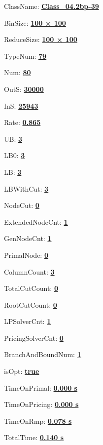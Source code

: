 \documentclass[11pt]{article}
\begin{document}
\pagestyle{empty}


ClassName: \underline{\textbf{Class_04.2bp-39}}
\par
BinSize: \underline{\textbf{100 × 100}}
\par
ReduceSize: \underline{\textbf{100 × 100}}
\par
TypeNum: \underline{\textbf{79}}
\par
Num: \underline{\textbf{80}}
\par
OutS: \underline{\textbf{30000}}
\par
InS: \underline{\textbf{25943}}
\par
Rate: \underline{\textbf{0.865}}
\par
UB: \underline{\textbf{3}}
\par
LB0: \underline{\textbf{3}}
\par
LB: \underline{\textbf{3}}
\par
LBWithCut: \underline{\textbf{3}}
\par
NodeCut: \underline{\textbf{0}}
\par
ExtendedNodeCnt: \underline{\textbf{1}}
\par
GenNodeCnt: \underline{\textbf{1}}
\par
PrimalNode: \underline{\textbf{0}}
\par
ColumnCount: \underline{\textbf{3}}
\par
TotalCutCount: \underline{\textbf{0}}
\par
RootCutCount: \underline{\textbf{0}}
\par
LPSolverCnt: \underline{\textbf{1}}
\par
PricingSolverCnt: \underline{\textbf{0}}
\par
BranchAndBoundNum: \underline{\textbf{1}}
\par
isOpt: \underline{\textbf{true}}
\par
TimeOnPrimal: \underline{\textbf{0.000 s}}
\par
TimeOnPricing: \underline{\textbf{0.000 s}}
\par
TimeOnRmp: \underline{\textbf{0.078 s}}
\par
TotalTime: \underline{\textbf{0.140 s}}
\par
\newpage
\end{document}
